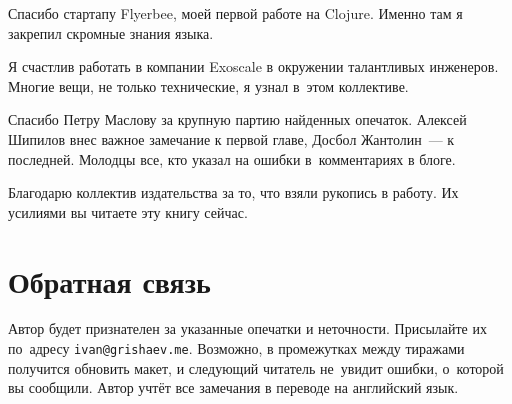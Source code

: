 Спасибо стартапу Flyerbee, моей первой работе на Clojure. Именно там я закрепил
скромные знания языка.

Я счастлив работать в компании Exoscale в окружении талантливых
инженеров. Многие вещи, не только технические, я узнал в~этом коллективе.

Спасибо Петру Маслову за крупную партию найденных опечаток. Алексей Шипилов внес
важное замечание к первой главе, Досбол Жантолин~--- к последней. Молодцы все,
кто указал на ошибки в~комментариях в блоге.

Благодарю коллектив издательства \publisher за то, что взяли рукопись в
работу. Их усилиями вы читаете эту книгу сейчас.

\section*{Обратная связь}

Автор будет признателен за указанные опечатки и неточности. Присылайте их
по~адресу \verb|ivan@grishaev.me|. Возможно, в промежутках между тиражами
получится обновить макет, и следующий читатель не~увидит ошибки, о~которой вы
сообщили. Автор учтёт все замечания в переводе на английский язык.
